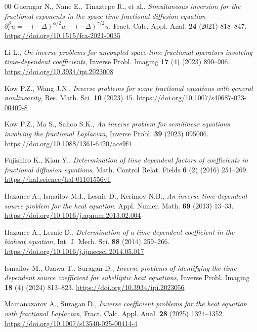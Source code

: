 \documentclass[reqno]{amsart}
\begin{document}
\begin{thebibliography}{00}
Guerngar N., Nane E., Tinaztepe R., et al., \textit{Simultaneous inversion for the fractional exponents in the space-time fractional diffusion equation $\partial_t^{\beta} u = -(-\Delta)^{\alpha/2} u - (-\Delta)^{\gamma/2}u$}, Fract. Calc. Appl. Anal. \textbf{24} (2021) 818--847. \url{https://doi.org/10.1515/fca-2021-0035}

Li L., \textit{On inverse problems for uncoupled space-time fractional operators involving time-dependent coefficients}, Inverse Probl. Imaging \textbf{17} (4) (2023) 890--906. \url{https://doi.org/10.3934/ipi.2023008}

Kow P.Z., Wang J.N., \textit{Inverse problems for some fractional equations with general nonlinearity}, Res. Math. Sci. \textbf{10} (2023) 45. \url{https://doi.org/10.1007/s40687-023-00409-8}

Kow P.Z., Ma S., Sahoo S.K., \textit{An inverse problem for semilinear equations involving the fractional Laplacian}, Inverse Probl. \textbf{39} (2023) 095006. \url{https://doi.org/10.1088/1361-6420/ace9f4}

Fujishiro K., Kian Y., \textit{Determination of time dependent factors of coefficients in fractional diffusion equations}, Math. Control Relat. Fields \textbf{6} (2) (2016) 251--269. \url{https://hal.science/hal-01101556v1}

Hazanee A., Ismailov M.I., Lesnic D., Kerimov N.B., \textit{An inverse time-dependent source problem for the heat equation}, Appl. Numer. Math. \textbf{69} (2013) 13--33. \url{https://doi.org/10.1016/j.apnum.2013.02.004}

Hazanee A., Lesnic D., \textit{Determination of a time-dependent coefficient in the bioheat equation}, Int. J. Mech. Sci. \textbf{88} (2014) 259--266. \url{https://doi.org/10.1016/j.ijmecsci.2014.05.017}

Ismailov M., Ozawa T., Suragan D., \textit{Inverse problems of identifying the time-dependent source coefficient for subelliptic heat equations}, Inverse Probl. Imaging \textbf{18} (4) (2024) 813--823. \url{https://doi.org/10.3934/ipi.2023056}

Mamanazarov A., Suragan D., \textit{Inverse coefficient problems for the heat equation with fractional Laplacian}, Fract. Calc. Appl. Anal. \textbf{28} (2025) 1324--1352. \url{https://doi.org/10.1007/s13540-025-00414-4}



\end{thebibliography}
\end{document}
